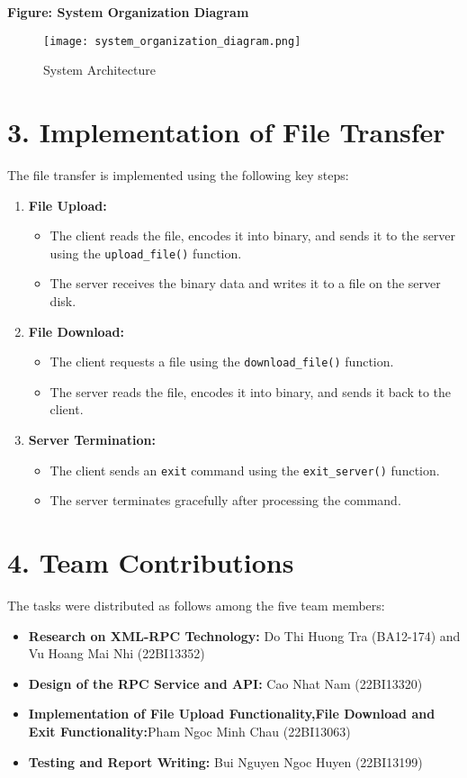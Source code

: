 \documentclass[a4paper,12pt]{article}
\begin{document}
\noindent \textbf{Figure: System Organization Diagram}
\begin{figure}[h!]
    \centering
    \texttt{[image: system\_organization\_diagram.png]} %
    \caption{System Architecture}
\end{figure}

\section*{3. Implementation of File Transfer}
The file transfer is implemented using the following key steps:
\begin{enumerate}
    \item \textbf{File Upload:}
    \begin{itemize}
        \item The client reads the file, encodes it into binary, and sends it to the server using the \texttt{upload\_file()} function.
        \item The server receives the binary data and writes it to a file on the server disk.
    \end{itemize}
    \item \textbf{File Download:}
    \begin{itemize}
        \item The client requests a file using the \texttt{download\_file()} function.
        \item The server reads the file, encodes it into binary, and sends it back to the client.
    \end{itemize}
    \item \textbf{Server Termination:}
    \begin{itemize}
        \item The client sends an \texttt{exit} command using the \texttt{exit\_server()} function.
        \item The server terminates gracefully after processing the command.
    \end{itemize}
\end{enumerate}

\section*{4. Team Contributions}
The tasks were distributed as follows among the five team members:
\begin{itemize}
    \item \textbf{Research on XML-RPC Technology:} Do Thi Huong Tra (BA12-174) and Vu Hoang Mai Nhi (22BI13352)
    \item \textbf{Design of the RPC Service and API:} Cao Nhat Nam (22BI13320) 
    \item \textbf{Implementation of File Upload Functionality,File Download and Exit Functionality:}Pham Ngoc Minh Chau (22BI13063)
    \item \textbf{Testing and Report Writing:} Bui Nguyen Ngoc Huyen (22BI13199)
\end{itemize}
\end{document}
